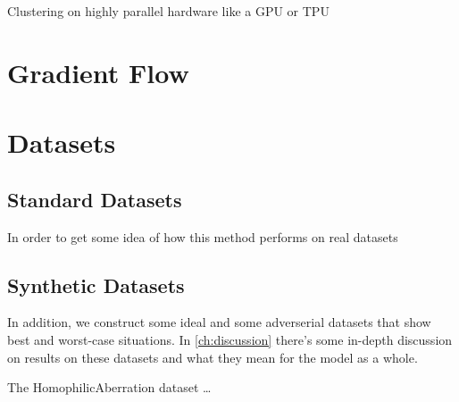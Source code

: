 \documentclass[../main.tex]{subfiles}
\begin{document}
    Clustering on highly parallel hardware like a GPU or TPU 

    \section{Gradient Flow}\label{sec:gradient-flow}


    \section{Datasets}\label{sec:datasets}
    \subsection{Standard Datasets}\label{subsec:standard-datasets}
    In order to get some idea of how this method performs on real datasets


    \subsection{Synthetic Datasets}\label{subsec:synthetic-datasets}
    In addition, we construct some ideal and some adverserial datasets that show best and worst-case situations.
    In \autoref{ch:discussion} there's some in-depth discussion on results on these datasets and what they mean for the model as a whole.

    The HomophilicAberration dataset \ldots {}


\end{document}
